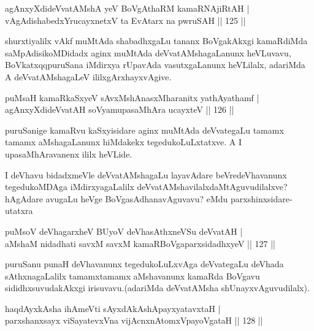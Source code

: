 

\begin{shl}
agAnxyXdideVvatAMshA yeV BoVgAthaRM kamaRNA\s jiRtAH |\\
vAgAdishabedxYrucayxnetxV ta EvAtarx na pwruSAH \hfill || 125 ||
\end{shl}

\begin{artha}
shurxtiyalilx vAkf muMtAda shabadhxgaLu tananx BoVgakAkxgi kamaRdiMda saMpAdisikoMDidadx aginx muMtAda deVvatAMshagaLanunx heVLuvavu, BoVkatxqqpuruSana iMdirxya rUpavAda vasutxgaLanunx heVLilalx, adariMda A deVvatAMshagaLeV ililxgArxhayxvAgive.
\end{artha}

\begin{shl}
puMsaH kamaRkaSxyeV sAvxMshAnasxMharanitx yathAyathamf |\\
agAnxyXdideVvatAH soV\s yamupasaMhAra ucayxteV \hfill || 126 ||
\end{shl}

\begin{artha}
puruSanige kamaRvu kaSxyisidare aginx muMtAda deVvategaLu tamamx tamamx aMshagaLanunx hiMdakekx tegedukoLuLxtatxve. A I upasaMhAravanenx ililx heVLide.
\end{artha}

\begin{artha}
I deVhavu bidadxmeVle deVvatAMshagaLu layavAdare beVredeVhavanunx tegedukoMDAga iMdirxyagaLalilx deVvatAMshavilalxdaMtAguvudilalxve? hAgAdare avugaLu heVge BoVgasAdhanavAguvavu? eMdu parxshinxsidare- utatxra 
\end{artha}

\begin{shl}
puMsoV deVhagarxheV BUyoV deVhasAthxneVSu deVvatAH |\\
aMshaM nidadhati savxM savxM kamaRBoVgaparxsidadhxyeV \hfill || 127 ||
\end{shl}

\begin{artha}
puruSanu punaH deVhavanunx tegedukoLuLxvAga deVvategaLu deVhada sAthxnagaLalilx tamamxtamamx aMshavanunx kamaRda BoVgavu sididhxsuvudakAkxgi irisuvavu.(adariMda deVvatAMsha shUnayxvAguvudilalx).
\end{artha}


\begin{shl}
haqdAyxkAsha ihA\s \s meVti sAyxdAkAshApayxyatavxtaH |\\
parxshanxsayx viSayatevxVna vijAcnxnAtomxVpayoVgataH \hfill || 128 ||
\end{shl}


